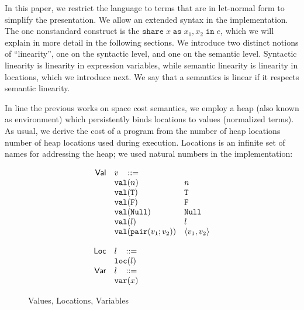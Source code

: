 \documentclass{easychair}
\newcommand{\ms}[1]{\ensuremath{\mathsf{#1}}}
\newcommand{\irl}[1]{\mathtt{#1}}
\newcommand{\sharecst}[4]{\irl{share}\;#1\;\irl{as}\;#2,#3\;\irl{in}\;#4}
\theoremstyle{definition}
\begin{document}
In this paper, we restrict the language to terms that are in let-normal form to simplify the presentation. We allow an extended syntax in the implementation. 
The one nonstandard construct is the $\sharecst{x}{x_1}{x_2}{e}$, which we will explain in more 
detail in the following sections. We introduce two distinct notions of ``linearity'', one on 
the syntactic level, and one on the semantic level. Syntactic linearity is linearity in 
expression variables, while semantic linearity is linearity in locations, which we introduce next.
We say that a semantics is linear if it respects semantic linearity.

In line the previous works on space cost semantics, we employ a heap (also known as 
environment) which persistently binds locations to values (normalized terms).
As usual, we derive the cost of a program from the number of heap locations 
number of heap locations used during execution. Locations is an infinite set of names for addressing
the heap; we used natural numbers in the implementation:

\begin{wrapfigure}{r}{0.5\textwidth}
	\vspace{-20pt}
	\[
\begin{array}{r l l l l}
\ms{Val}
        & v   \,\,\,\,\, ::= \\
 	& \irl{val}(n)                                			& n 											\\	
 	& \irl{val}(\irl{T})                               			& \irl{T} 								 \\ 
 	& \irl{val}(\irl{F})                                			& \irl{F}								 \\ 
 	& \irl{val}(\irl{Null})                                  & \irl{Null} 								 \\ 
 	& \irl{val}(l)                                			& l 								 \\ 
 	& \irl{val}(\pairexabt{v_1}{v_2})                             & \pairexcst{v_1}{v_2} 								 \\ 
  \\
\ms{Loc} & l   \,\,\,\,\, ::= \\
 	& \irl{loc}(l)                                		\\	
\ms{Var} & l   \,\,\,\,\, ::= \\
 	& \irl{var}(x)                                		\\	
\end{array}
\]
				\vspace{-20pt}
			\caption{Values, Locations, Variables}
		\vspace{-10pt}
\label{fig:val}
\end{wrapfigure}
\end{document}
